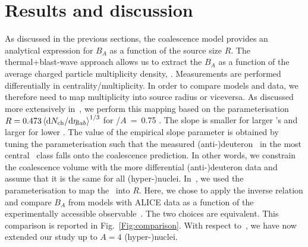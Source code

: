 \documentclass[a4paper,11pt]{article}
\begin{document}
\section{Results and discussion} \label{sec:results}
As discussed in the previous sections, the coalescence model provides an analytical expression for $B_A$ as a function of the source size $R$. 
The thermal+blast-wave approach allows us to extract the $B_A$ as a function of the average charged particle multiplicity density, \avdNdeta. Measurements are performed differentially in centrality/multiplicity.
In order to compare models and data, we therefore need to map multiplicity into source radius or viceversa. 
As discussed more extensively in~\cite{Bellini:2018epz}, we perform this mapping based on the parameterisation $R = 0.473 \left<\mathrm{d}N_\mathrm{ch}/\mathrm{d}\eta_{lab}\right>^{1/3}$ for \pt/$A$~=~0.75 \GeVc. The slope is smaller for larger \pt's and larger for lower \pt.
The value of the empirical slope parameter is obtained by tuning the parameterisation such that the measured (anti-)deuteron \btwo~in the most central \PbPb~class falls onto the coalescence prediction. In other words, we constrain the coalescence volume with the more differential (anti-)deuteron data and assume that it is the same for all (hyper-)nuclei. 
In~\cite{Bellini:2018epz}, we used the parameterisation to map the \avdNdeta~into $R$. Here, we chose to apply the inverse relation and compare $B_A$ from models with ALICE data as a function of the experimentally accessible observable~\avdNdeta. The two choices are equivalent. This comparison is reported in Fig.~\ref{Fig:comparison}. 
With respect to~\cite{Bellini:2018epz}, we have now extended our study up to $A=4$ \mbox{(hyper-)nuclei}. 
\end{document}
